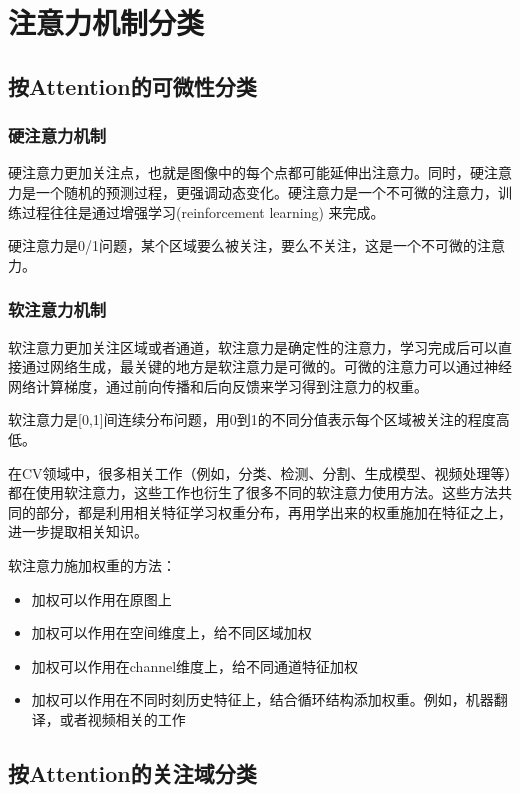 \documentclass[withoutpreface,bwprint]{cumcmthesis} %
\begin{document}
\section{注意力机制分类}

\subsection{按Attention的可微性分类}

\subsubsection{硬注意力机制}
硬注意力更加关注点，也就是图像中的每个点都可能延伸出注意力。同时，硬注意力是一个随机的预测过程，更强调动态变化。硬注意力是一个不可微的注意力，训练过程往往是通过增强学习(reinforcement learning) 来完成。

硬注意力是0/1问题，某个区域要么被关注，要么不关注，这是一个不可微的注意力。

\subsubsection{软注意力机制}

软注意力更加关注区域或者通道，软注意力是确定性的注意力，学习完成后可以直接通过网络生成，最关键的地方是软注意力是可微的。可微的注意力可以通过神经网络计算梯度，通过前向传播和后向反馈来学习得到注意力的权重。

软注意力是[0,1]间连续分布问题，用0到1的不同分值表示每个区域被关注的程度高低。

在CV领域中，很多相关工作（例如，分类、检测、分割、生成模型、视频处理等）都在使用软注意力，这些工作也衍生了很多不同的软注意力使用方法。这些方法共同的部分，都是利用相关特征学习权重分布，再用学出来的权重施加在特征之上，进一步提取相关知识。

软注意力施加权重的方法：

\begin{itemize}
    \item 加权可以作用在原图上
    \item 加权可以作用在空间维度上，给不同区域加权
    \item 加权可以作用在channel维度上，给不同通道特征加权
    \item 加权可以作用在不同时刻历史特征上，结合循环结构添加权重。例如，机器翻译，或者视频相关的工作
\end{itemize}

\subsection{按Attention的关注域分类}
\end{document}
